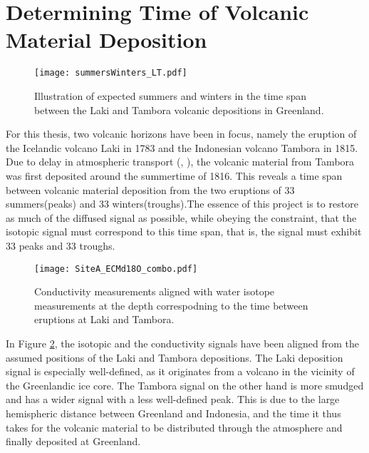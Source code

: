 \documentclass[../../CompleteThesis2/Complete_2ndDraft]{subfiles}
\begin{document}
\section[Volcanic Horizons][Volcanic Horizons]{Determining Time of Volcanic Material Deposition}
\label{Sec:Data_VolcanicHorizons}

\begin{figure}[h]
	\centering
	\texttt{[image: summersWinters\_LT.pdf]}
	\caption[Summers and Winters between Laki and Tambora]{\small Illustration of expected summers and winters in the time span between the Laki and Tambora volcanic depositions in Greenland.}
	\label{Fig:SummersAndWintersLT}
\end{figure}

For this thesis, two volcanic horizons have been in focus, namely the eruption of the Icelandic volcano Laki in 1783 and the Indonesian volcano Tambora in 1815. Due to delay in atmospheric transport (\cite[Wei et al., 2008]{Wei2008}, \cite[Cole-Dai et al, 2009]{Dai2009}), the volcanic material from Tambora was first deposited around the summertime of 1816. This reveals a time span between volcanic material deposition from the two eruptions of 33 summers(peaks) and 33 winters(troughs).The essence of this project is to restore as much of the diffused signal as possible, while obeying the constraint, that the isotopic signal must correspond to this time span, that is, the signal must exhibit 33 peaks and 33 troughs.


\begin{figure}[h]
	\centering
	\texttt{[image: SiteA\_ECMd18O\_combo.pdf]}
	\caption[ECM and $\delta^{18}$O data between Laki and Tambora, Site A.]{\small Conductivity measurements aligned with water isotope measurements at the depth correspodning to the time between eruptions at Laki and Tambora.}
	\label{Fig:DATA_SiteA_ECM_d18O_combo}
\end{figure}
In Figure \ref{Fig:DATA_SiteA_ECM_d18O_combo}, the isotopic and the conductivity signals have been aligned from the assumed positions of the Laki and Tambora depositions. The Laki deposition signal is especially well-defined, as it originates from a volcano in the vicinity of the Greenlandic ice core. The Tambora signal on the other hand is more smudged and has a wider signal with a less well-defined peak. This is due to the large hemispheric distance between Greenland and Indonesia, and the time it thus takes for the volcanic material to be distributed through the atmosphere and finally deposited at Greenland.
\end{document}
